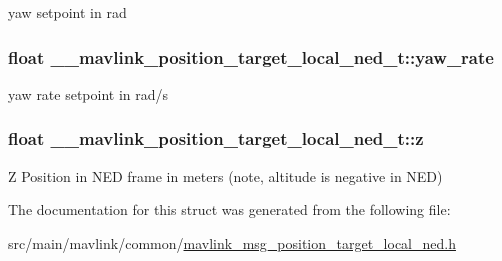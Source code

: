 yaw setpoint in rad 

\hypertarget{struct____mavlink__position__target__local__ned__t_aac456c006e0ab4bba92d09b76fbd0cf1}{
\subsubsection[{yaw\+\_\+rate}]{\setlength{\rightskip}{0pt plus 5cm}float \+\_\+\+\_\+mavlink\+\_\+position\+\_\+target\+\_\+local\+\_\+ned\+\_\+t\+::yaw\+\_\+rate}}\label{struct____mavlink__position__target__local__ned__t_aac456c006e0ab4bba92d09b76fbd0cf1}


yaw rate setpoint in rad/s 

\hypertarget{struct____mavlink__position__target__local__ned__t_a367fead644dcd0cb7f6147ce129115ce}{
\subsubsection[{z}]{\setlength{\rightskip}{0pt plus 5cm}float \+\_\+\+\_\+mavlink\+\_\+position\+\_\+target\+\_\+local\+\_\+ned\+\_\+t\+::z}}\label{struct____mavlink__position__target__local__ned__t_a367fead644dcd0cb7f6147ce129115ce}


Z Position in N\+E\+D frame in meters (note, altitude is negative in N\+E\+D) 



The documentation for this struct was generated from the following file\+:\begin{DoxyCompactItemize}
\item 
src/main/mavlink/common/\hyperlink{mavlink__msg__position__target__local__ned_8h}{mavlink\+\_\+msg\+\_\+position\+\_\+target\+\_\+local\+\_\+ned.\+h}\end{DoxyCompactItemize}
